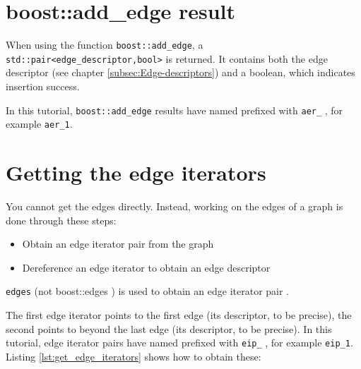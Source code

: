 \section{boost::add\_edge result}
\label{subsec:boost_add_edge_result}

When using the function \verb;boost::add_edge;, 
a \verb;std::pair<edge_descriptor,bool>; is returned.
It contains both the edge descriptor 
(see chapter \ref{subsec:Edge-descriptors}) 
and a boolean, which indicates insertion success.

In this tutorial, \verb;boost::add_edge; results 
have named prefixed with \verb;aer_; ,
for example \verb;aer_1;.

\section{Getting the edge iterators}
\label{subsec:get_edge_iterators}

You cannot get the edges directly.
Instead, working on the edges of a graph is done through these steps:

\begin{itemize}
  \item Obtain an edge iterator pair from the graph
  \item Dereference an edge iterator to obtain an edge descriptor
\end{itemize}

\verb;edges;  
(not boost::edges )
is used to obtain an edge iterator pair
.

The first edge iterator 
points to the first edge (its descriptor, to be precise), the second points
to beyond the last edge (its descriptor, to be precise).
In this tutorial, 
edge iterator pairs have named prefixed with \verb;eip_; , 
for example \verb;eip_1;.
Listing \ref{lst:get_edge_iterators}
shows how to obtain these:



